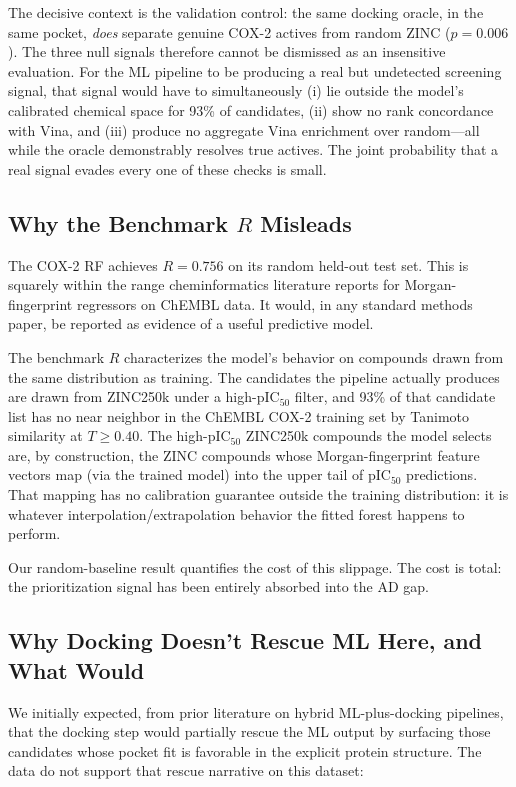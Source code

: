 \documentclass[11pt]{article}
\begin{document}
The decisive context is the validation control: the same docking oracle, in the same pocket, \emph{does} separate genuine COX-2 actives from random ZINC ($p = 0.006$). The three null signals therefore cannot be dismissed as an insensitive evaluation. For the ML pipeline to be producing a real but undetected screening signal, that signal would have to simultaneously (i) lie outside the model's calibrated chemical space for 93\% of candidates, (ii) show no rank concordance with Vina, and (iii) produce no aggregate Vina enrichment over random---all while the oracle demonstrably resolves true actives. The joint probability that a real signal evades every one of these checks is small.

\subsection{Why the Benchmark $R$ Misleads}

The COX-2 RF achieves $R = 0.756$ on its random held-out test set. This is squarely within the range cheminformatics literature reports for Morgan-fingerprint regressors on ChEMBL data. It would, in any standard methods paper, be reported as evidence of a useful predictive model.

The benchmark $R$ characterizes the model's behavior on compounds drawn from the same distribution as training. The candidates the pipeline actually produces are drawn from ZINC250k under a high-pIC$_{50}$ filter, and 93\% of that candidate list has no near neighbor in the ChEMBL COX-2 training set by Tanimoto similarity at $T \geq 0.40$. The high-pIC$_{50}$ ZINC250k compounds the model selects are, by construction, the ZINC compounds whose Morgan-fingerprint feature vectors map (via the trained model) into the upper tail of pIC$_{50}$ predictions. That mapping has no calibration guarantee outside the training distribution: it is whatever interpolation/extrapolation behavior the fitted forest happens to perform.

Our random-baseline result quantifies the cost of this slippage. The cost is total: the prioritization signal has been entirely absorbed into the AD gap.

\subsection{Why Docking Doesn't Rescue ML Here, and What Would}

We initially expected, from prior literature on hybrid ML-plus-docking pipelines, that the docking step would partially rescue the ML output by surfacing those candidates whose pocket fit is favorable in the explicit protein structure. The data do not support that rescue narrative on this dataset:
\end{document}
